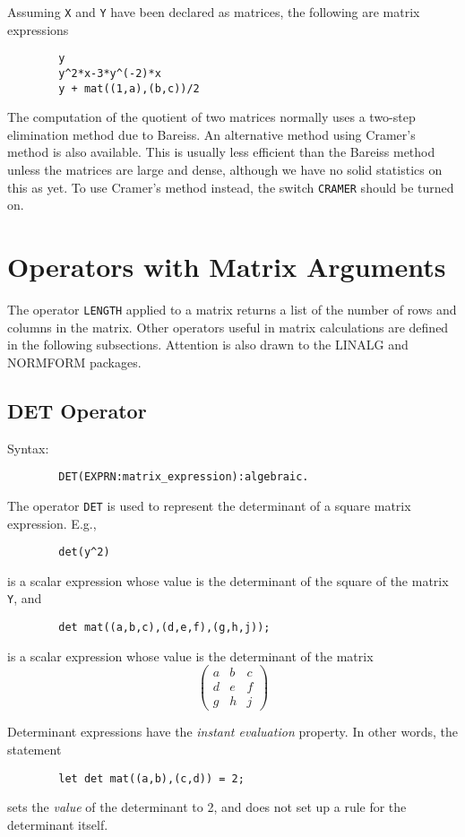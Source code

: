 Assuming {\tt X} and {\tt Y} have been declared as matrices, the following
are matrix expressions
\begin{verbatim}
        y
        y^2*x-3*y^(-2)*x
        y + mat((1,a),(b,c))/2
\end{verbatim}
The computation of the quotient of two matrices normally uses a two-step
elimination method due to Bareiss.  An alternative method using Cramer's
method is also available.  This is usually less efficient than the Bareiss
method unless the matrices are large and dense, although we have no solid
statistics on this as yet.  To use Cramer's method instead, the switch
{\tt CRAMER} should be turned on.


\section{Operators with Matrix Arguments}

The operator {\tt LENGTH} applied to a matrix returns a
list of the number of rows and columns in the matrix.  Other operators
useful in matrix calculations are defined in the following subsections.
Attention is also drawn to the LINALG and NORMFORM packages.

\subsection{DET Operator}
Syntax:
\begin{verbatim}
        DET(EXPRN:matrix_expression):algebraic.
\end{verbatim}

The operator {\tt DET} is used to represent the determinant of a square
matrix expression.  E.g.,
\begin{verbatim}
        det(y^2)
\end{verbatim}
is a scalar expression whose value is the determinant of the square of the
matrix {\tt Y}, and
\begin{verbatim}
        det mat((a,b,c),(d,e,f),(g,h,j));
\end{verbatim}
is a scalar expression whose value is the determinant of the matrix
\[ \left( \begin{array}{lcr} a & b & c \\ d & e & f \\ g & h & j
\end{array} \right) \]

Determinant expressions have the {\em instant evaluation\/} property.
  In other words, the statement
\begin{verbatim}
        let det mat((a,b),(c,d)) = 2;
\end{verbatim}
sets the {\em value\/} of the determinant to 2, and does not set up a rule
for the determinant itself.

